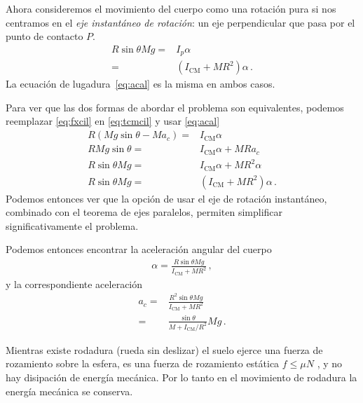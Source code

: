 Ahora consideremos el movimiento del cuerpo como una rotación pura si
nos centramos en el \emph{eje instantáneo de rotación}: un eje
perpendicular que pasa por el punto de contacto $P$.
\begin{align*}
  R\sin\theta M g=&I_p\alpha\nonumber\\
  =&(I_{\text{CM}}+MR^2)\alpha\,.
\end{align*}
La ecuación de lugadura~\eqref{eq:acal} es la misma en ambos casos. 


Para ver que las dos formas de abordar el problema son equivalentes, podemos reemplazar \eqref{eq:fxcil} en \eqref{eq:tcmcil} y usar \eqref{eq:acal} 
\begin{align*}
  R(Mg\sin\theta-M a_c)=&I_{\text{CM}}\alpha\nonumber\\
  RMg\sin\theta=&I_{\text{CM}}\alpha+M R a_c\nonumber\\
  R\sin\theta Mg=&I_{\text{CM}}\alpha+M R^2\alpha\nonumber\\
  R\sin\theta Mg=&(I_{\text{CM}}+M R^2)\alpha\,.
\end{align*}
Podemos entonces ver que la opción de usar el eje de rotación instantáneo, combinado con el teorema de ejes paralelos, permiten simplificar significativamente el problema.

Podemos entonces encontrar la aceleración angular del cuerpo
\begin{align}
  \alpha=\frac{R\sin\theta M g}{I_{\text{CM}}+MR^2}\,,
\end{align}
y la correspondiente aceleración
\begin{align}
  \label{eq:acelcil}
  a_c=&\frac{R^2\sin\theta M g}{I_{\text{CM}}+MR^2}\nonumber\\
  =&\frac{\sin\theta }{M+I_{\text{CM}}/R^2}M g\,.
\end{align}


Mientras existe rodadura (rueda sin deslizar) el suelo ejerce una
fuerza de rozamiento sobre la esfera, es una fuerza de rozamiento
estática $f \le\mu N$ , y no hay disipación de energía mecánica. 
Por lo tanto en el movimiento de rodadura la energía mecánica se
conserva.

